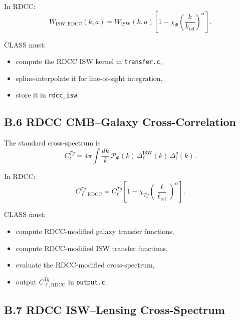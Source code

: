 \documentclass[11pt,a4paper]{article}
\begin{document}
In RDCC:
\begin{equation}
    W_{\mathrm{ISW,RDCC}}(k,a)
    = W_{\mathrm{ISW}}(k,a)
      \left[
        1 - \chi_{\Phi}
        \left(\frac{k}{k_{\mathrm{rel}}}\right)^{\alpha}
      \right].
\end{equation}

CLASS must:

\begin{itemize}
    \item compute the RDCC ISW kernel in \texttt{transfer.c},
    \item spline-interpolate it for line-of-sight integration,
    \item store it in \texttt{rdcc\_isw}.
\end{itemize}

\subsection*{B.6 RDCC CMB–Galaxy Cross-Correlation}

The standard cross-spectrum is
\begin{equation}
    C_{\ell}^{Tg}
    = 4\pi \int \frac{dk}{k}\,
      \mathcal{P}_{\Phi}(k)\,
      \Delta_{\ell}^{\mathrm{ISW}}(k)\,
      \Delta_{\ell}^{g}(k).
\end{equation}

In RDCC:
\begin{equation}
    C_{\ell,\mathrm{RDCC}}^{Tg}
    = C_{\ell}^{Tg}
      \left[
        1 - \chi_{Tg}
        \left(\frac{\ell}{\ell_{\mathrm{rel}}}\right)^{\alpha}
      \right].
\end{equation}

CLASS must:

\begin{itemize}
    \item compute RDCC-modified galaxy transfer functions,
    \item compute RDCC-modified ISW transfer functions,
    \item evaluate the RDCC-modified cross-spectrum,
    \item output $C_{\ell,\mathrm{RDCC}}^{Tg}$ in \texttt{output.c}.
\end{itemize}

\subsection*{B.7 RDCC ISW–Lensing Cross-Spectrum}
\end{document}
